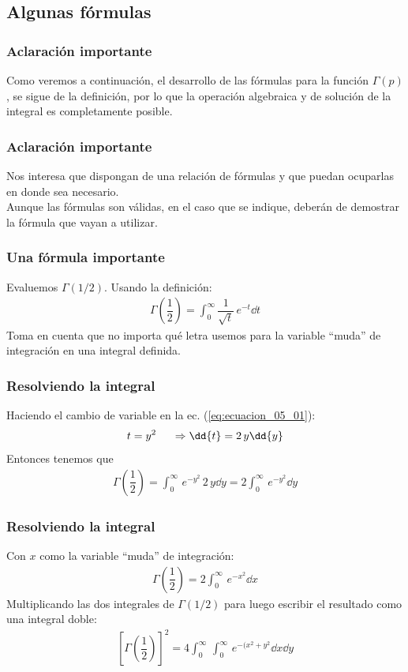 \subsection{Algunas fórmulas}
\begin{frame}
\frametitle{Aclaración importante}
Como veremos a continuación, el desarrollo de las fórmulas para la función $\Gamma (p)$, se sigue de la definición, por lo que la operación algebraica y de solución de la integral es completamente posible.
\end{frame}
\begin{frame}
   \frametitle{Aclaración importante}
Nos interesa que dispongan de una relación de fórmulas y que puedan ocuparlas en donde sea necesario.
\\
\bigskip
Aunque las fórmulas son válidas, en el caso que se indique, deberán de demostrar la fórmula que vayan a utilizar.
\end{frame}
\begin{frame}
\frametitle{Una fórmula importante}
Evaluemos $\Gamma (1/2)$. Usando la definición:
\begin{align}
\Gamma \left( \dfrac{1}{2}\right) = \int_{0}^{\infty} \dfrac{1}{\sqrt{t}} \, e^{-t} \dd{t}
\label{eq:ecuacion_05_01}
\end{align}
\pause
Toma en cuenta que no importa qué letra usemos para la variable \enquote{muda} de integración en una integral definida.
\end{frame}
\begin{frame}
\frametitle{Resolviendo la integral}
Haciendo el cambio de variable en la ec. (\ref{eq:ecuacion_05_01}):
\begin{align*}
t = y^{2} \hspace{0.5cm} \Rightarrow \dd{t} = 2 \, y \dd{y}
\end{align*}
Entonces tenemos que
\begin{align*}
\Gamma \left( \dfrac{1}{2} \right) = \int_{0}^{\infty} \, e^{-y^{2}} \, 2 \, y \dd{y} = 2 \int_{0}^{\infty} \, e^{-y^{2}} \dd{y}
\end{align*}
\fontsize{12}{12}\selectfont
\end{frame}
\begin{frame}
\frametitle{Resolviendo la integral}
Con $x$ como la variable \enquote{muda} de integración:
\begin{align}
\Gamma \left( \dfrac{1}{2} \right) = 2 \int_{0}^{\infty} \, e^{-x^{2}} \dd{x}
\label{eq:ecuacion_05_02}
\end{align}
\pause
Multiplicando las dos integrales de $\Gamma (1/2)$ para luego escribir el resultado como una integral doble:
\begin{align*}
\left[ \Gamma \left( \dfrac{1}{2} \right) \right]^{2} = 4 \int_{0}^{\infty} \, \int_{0}^{\infty} \, e^{-(x^{2} + y^{2}} \dd{x} \dd{y}
\end{align*}
\end{frame}
